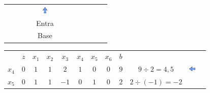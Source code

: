 \begin{frame}
{\begin{table}
\begin{tabular}{c c c c c c c c c c c c}
				& 
				&  
				& 
				& \includegraphics[width=0.3cm,height=0.3cm]{setacima.jpg}
				& 
				& 
				&  
				&  \\
				
				& 
				&  
				& 
				& \scriptsize Entra 
				& 
				& 
				&  
				&  \\
				
				& 
				&  
				& 
				& \scriptsize Base
				& 
				& 
				&  
				&  \\
			\end{tabular}
		\end{table}
	}
	{
		\begin{table}
			\begin{tabular}{c c c c c c c c c c c c}
				& \cellcolor{blue!80} \color{white} $ \scriptstyle z$
				& \cellcolor{blue!80} \color{white} $ \scriptstyle x_1$ 
				& \cellcolor{blue!80} \color{white} $ \scriptstyle x_2$
				& \cellcolor{blue!80} \color{white} $ \scriptstyle x_3$
				& \cellcolor{blue!80} \color{red} $ \scriptstyle x_4$
				& \cellcolor{blue!80} \color{red} $ \scriptstyle x_5$
				& \cellcolor{blue!80} \color{red} $ \scriptstyle x_6$ 
				& \cellcolor{blue!80} \color{white} $ \scriptstyle b$ 
				& & & \\
				\cellcolor{blue!80} \color{red} $ \scriptstyle x_4$
				& \cellcolor{yellow!60}  $ \scriptstyle 0$
				& \cellcolor{yellow!60}  $ \scriptstyle 1$ 
				& \cellcolor{yellow!60}  $ \scriptstyle 1$
				& \cellcolor{gray!60}  $ \scriptstyle 2$
				& \cellcolor{yellow!60}  $ \scriptstyle 1$
				& \cellcolor{yellow!60}  $ \scriptstyle 0$
				& \cellcolor{yellow!60}  $ \scriptstyle 0$ 
				& \cellcolor{gray!60}  $ \scriptstyle 9$ 
				& $ \scriptstyle 9 \div 2 = 4,5 $ & \includegraphics[width=0.3cm,height=0.3cm]{setaesquerda.jpg} & \\ 
				\cellcolor{blue!80} \color{red} $ \scriptstyle x_5$  
				& \cellcolor{yellow!60}  $ \scriptstyle 0$
				& \cellcolor{yellow!60}  $ \scriptstyle 1$ 
				& \cellcolor{yellow!60}  $ \scriptstyle 1$
				& \cellcolor{gray!60}  $ \scriptstyle -1$
				& \cellcolor{yellow!60}  $ \scriptstyle 0$
				& \cellcolor{yellow!60}  $ \scriptstyle 1$
				& \cellcolor{yellow!60}  $ \scriptstyle 0$ 
				& \cellcolor{gray!60}  $ \scriptstyle 2$
				& $ \scriptstyle 2 \div (-1) = -2 $ & & \\

\end{tabular}
\end{table}}
\end{frame}
